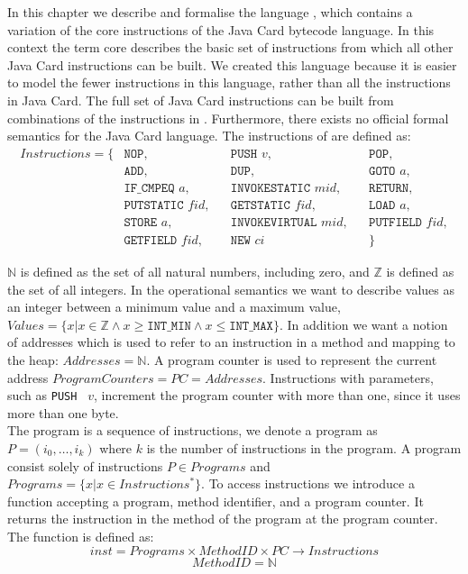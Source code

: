 \label{sec:semintro}
In this chapter we describe and formalise the language \jcl, which contains a variation of the core instructions of the Java Card bytecode language. In this context the term core describes the basic set of instructions from which all other Java Card instructions can be built. 
We created this language because it is easier to model the fewer instructions in this language, rather than all the instructions in Java Card.
The full set of Java Card instructions can be built from combinations of the instructions in \jcl.
Furthermore, there exists no official formal semantics for the Java Card language.
The instructions of \jcl are defined as:
\begin{align*}
  Instructions = \{
  & \texttt{NOP}, && \texttt{PUSH } v, && \texttt{POP}, \\ 
  & \texttt{ADD}, && \texttt{DUP}, && \texttt{GOTO } a, \\ 
  & \texttt{IF\_CMPEQ } a, && \texttt{INVOKESTATIC } mid, && \texttt{RETURN},\\ 
  & \texttt{PUTSTATIC } fid, && \texttt{GETSTATIC } fid, && \texttt{LOAD } a, \\
  & \texttt{STORE } a, && \texttt{INVOKEVIRTUAL } mid, && \texttt{PUTFIELD } fid,\\ 
  & \texttt{GETFIELD } fid, && \texttt{NEW } ci && \}
\end{align*}

$\mathbb{N}$ is defined as the set of all natural numbers, including zero, and $\mathbb{Z}$ is defined as the set of all integers.
In the operational semantics we want to describe values as an integer between a minimum value and a maximum value, $Values = \{ x | x \in \mathbb{Z} \wedge x \geq \texttt{INT\_MIN} \wedge x \leq \texttt{INT\_MAX} \}$.
In addition we want a notion of addresses which is used to refer to an instruction in a method and mapping to the heap: $Addresses  = \mathbb{N}$.
A program counter is used to represent the current address $ProgramCounters = PC = Addresses$. Instructions with parameters, such as \texttt{PUSH } $v$, increment the program counter with more than one, since it uses more than one byte. \\

The program is a sequence of instructions, we denote a program as $P = (i_0, \ldots, i_k)$ where $k$ is the number of instructions in the program. 
A program consist solely of instructions $P \in Programs$ and $Programs =  \{ x | x \in Instructions^{*} \}$.
To access instructions we introduce a function accepting a program, method identifier, and a program counter. 
It returns the instruction in the method of the program at the program counter.
The function is defined as:
$$inst = Programs \times MethodID \times PC \to   Instructions$$
$$MethodID = \mathbb{N}$$

